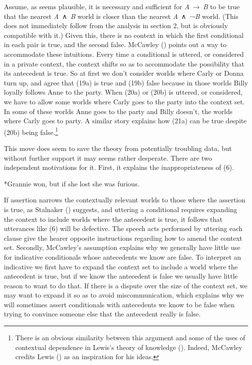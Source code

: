 \documentclass[
  11pt,
  letterpaper,
  DIV=11,
  numbers=noendperiod,
  twoside]{scrartcl}
\providecommand{\tightlist}{%
  \setlength{\itemsep}{0pt}\setlength{\parskip}{0pt}}\usepackage{longtable,booktabs,array}
\begin{document}
Assume, as seems plausible, it is necessary and sufficient for
\emph{A}~→~\emph{B} to be true that the nearest \emph{A}~∧~\emph{B}
world is closer than the nearest \emph{A}~∧~¬\emph{B} world. (This does
not immediately follow from the analysis in section 2, but is obviously
compatible with it.) Given this, there is no context in which the first
conditional in each pair is true, and the second false. McCawley
() points out a way to accommodate
these intuitions. Every time a conditional is uttered, or considered in
a private context, the context shifts so as to accommodate the
possibility that its antecedent is true. So at first we don't consider
worlds where Carly or Donna turn up, and agree that (19a) is true and
(19b) false because in those worlds Billy loyally follows Anne to the
party. When (20a) or (20b) is uttered, or considered, we have to allow
some worlds where Carly goes to the party into the context set. In some
of these worlds Anne goes to the party and Billy doesn't, the worlds
where Carly goes to party. A similar story explains how (21a) can be
true despite (20b) being false.\footnote{There is an obvious similarity
  between this argument and some of the uses of contextual dependence in
  Lewis's theory of knowledge ().
  Indeed, McCawley credits Lewis () as
  an inspiration for his ideas.}

This move does seem to save the theory from potentially troubling data,
but without further support it may seems rather desperate. There are two
independent motivations for it. First, it explains the inappropriateness
of (6).

\begin{description}
\tightlist
\item[(6)]
*Grannie won, but if she lost she was furious.
\end{description}

If assertion narrows the contextually relevant worlds to those where the
assertion is true, as Stalnaker ()
suggests, and uttering a conditional requires expanding the context to
include worlds where the antecedent is true, it follows that utterances
like (6) will be defective. The speech acts performed by uttering each
clause give the hearer opposite instructions regarding how to amend the
context set. Secondly, McCawley's assumption explains why we generally
have little use for indicative conditionals whose antecedents we know
are false. To interpret an indicative we first have to expand the
context set to include a world where the antecedent is true, but if we
know the antecedent is false we usually have little reason to want to do
that. If there is a dispute over the size of the context set, we may
want to expand it so as to avoid miscommunication, which explains why we
will sometimes assert conditionals with antecedents we know to be false
when trying to convince someone else that the antecedent really is
false.
\end{document}
